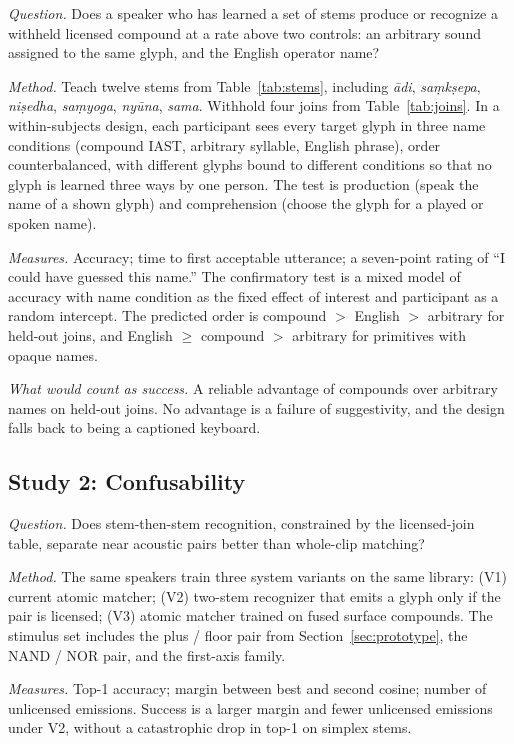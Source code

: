 \documentclass[manuscript, review, anonymous]{acmart}
\begin{document}
\textit{Question.} Does a speaker who has learned a set of stems produce or recognize a withheld licensed compound at a rate above two controls: an arbitrary sound assigned to the same glyph, and the English operator name?

\textit{Method.} Teach twelve stems from Table~\ref{tab:stems}, including \textit{{\=a}di}, \textit{sa{\d{m}}k{\d{s}}epa}, \textit{ni{\d{s}}edha}, \textit{sa{\d{m}}yoga}, \textit{ny{\=u}na}, \textit{sama}. Withhold four joins from Table~\ref{tab:joins}. In a within-subjects design, each participant sees every target glyph in three name conditions (compound IAST, arbitrary syllable, English phrase), order counterbalanced, with different glyphs bound to different conditions so that no glyph is learned three ways by one person. The test is production (speak the name of a shown glyph) and comprehension (choose the glyph for a played or spoken name).

\textit{Measures.} Accuracy; time to first acceptable utterance; a seven-point rating of ``I could have guessed this name.'' The confirmatory test is a mixed model of accuracy with name condition as the fixed effect of interest and participant as a random intercept. The predicted order is compound $>$ English $>$ arbitrary for held-out joins, and English $\geq$ compound $>$ arbitrary for primitives with opaque names.

\textit{What would count as success.} A reliable advantage of compounds over arbitrary names on held-out joins. No advantage is a failure of suggestivity, and the design falls back to being a captioned keyboard.

\subsection{Study 2: Confusability}

\textit{Question.} Does stem-then-stem recognition, constrained by the licensed-join table, separate near acoustic pairs better than whole-clip matching?

\textit{Method.} The same speakers train three system variants on the same library: (V1) current atomic matcher; (V2) two-stem recognizer that emits a glyph only if the pair is licensed; (V3) atomic matcher trained on fused surface compounds. The stimulus set includes the plus / floor pair from Section~\ref{sec:prototype}, the NAND / NOR pair, and the first-axis family.

\textit{Measures.} Top-1 accuracy; margin between best and second cosine; number of unlicensed emissions. Success is a larger margin and fewer unlicensed emissions under V2, without a catastrophic drop in top-1 on simplex stems.
\end{document}
